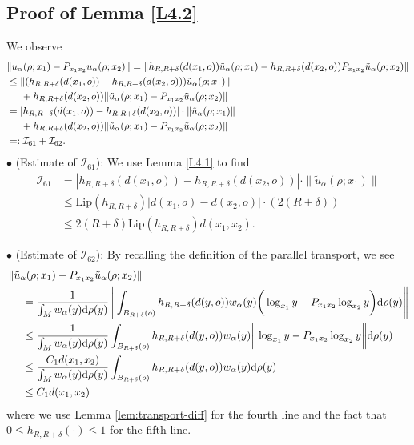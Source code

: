 \documentclass[11pt]{amsart}
\def\d{\mathrm{d}}
\newcommand{\p}{o}%
\newcommand{\dist}{d}%
\begin{document}
\subsection{Proof of Lemma \ref{L4.2}}\label{proof:L4.2}
We observe 
\begin{align*}
&\|u_\alpha(\rho;x_1)-P_{x_1x_2}u_\alpha(\rho;x_2)\| = \|h_{R,R+\delta}(\dist(x_1, \p))\tilde{u}_\alpha(\rho;x_1)-h_{R,R+\delta}(\dist(x_2, \p))P_{x_1x_2}\tilde{u}_\alpha(\rho;x_2)\|\\
&\leq\|(h_{R, R+\delta}(\dist(x_1, \p))-h_{R, R+\delta}(\dist(x_2, \p)))\tilde{u}_\alpha(\rho;x_1)\| \\
&\hspace{0.5cm}+h_{R, R+\delta}(\dist(x_2, \p))\|\tilde{u}_\alpha(\rho;x_1)-P_{x_1x_2}\tilde{u}_\alpha(\rho;x_2)\|\\
& = |h_{R, R+\delta}(\dist(x_1, \p))-h_{R, R+\delta}(\dist(x_2, \p))|\cdot \|\tilde{u}_\alpha(\rho;x_1)\| \\
&\hspace{0.5cm}+h_{R, R+\delta}(\dist(x_2, \p))\|\tilde{u}_\alpha(\rho;x_1)-P_{x_1x_2}\tilde{u}_\alpha(\rho;x_2)\| \\
&=: \mathcal I_{61} + \mathcal I_{62}.
\end{align*}
$\bullet$ (Estimate of $\mathcal I_{61}$): We use Lemma \ref{L4.1} to find 
\begin{align*}
\mathcal I_{61} & = |h_{R, R+\delta}(\dist(x_1, \p))-h_{R, R+\delta}(\dist(x_2, \p))|\cdot \|\tilde{u}_\alpha(\rho;x_1)\| \\
&\leq \mathrm{Lip}(h_{R, R+\delta})|\dist(x_1, \p)-\dist(x_2, \p)|\cdot (2(R+\delta))\\
&\leq2(R+\delta)\mathrm{Lip}(h_{R, R+\delta})\dist(x_1, x_2).
\end{align*}

\noindent $\bullet$ (Estimate of $\mathcal I_{62}$): By recalling the definition of the parallel transport, we see
\begin{align*}
&\left\|\tilde{u}_\alpha(\rho;x_1)-P_{x_1 x_2}\tilde{u}_\alpha(\rho;x_2)\right\|\\
&\hspace{0.5cm}=\frac{1}{\int_M w_\alpha(y)\d\rho(y)}\left\|\int_{B_{R+\delta}(\p)}h_{R, R+\delta}(\dist(y, \p))w_\alpha(y)\bigg(\log_{x_1}y-P_{x_1x_2}\log_{x_2}y\bigg)\d \rho(y)\right\|\\
&\hspace{0.5cm}\leq\frac{1}{\int_M w_\alpha(y)\d\rho(y)}\int_{B_{R+\delta}(\p)}h_{R, R+\delta}(\dist(y, \p))w_\alpha(y)\bigg\|\log_{x_1}y-P_{x_1x_2}\log_{x_2}y\bigg\|\d \rho(y)\\
&\hspace{0.5cm}\leq\frac{C_1\dist(x_1, x_2)}{\int_M w_\alpha(y)\d\rho(y)}\int_{B_{R+\delta}(\p)}h_{R, R+\delta}(\dist(y, \p))w_\alpha(y)\d \rho(y)\\
&\hspace{0.5cm}\leq C_1\dist(x_1, x_2)
\end{align*}
where we use Lemma \ref{lem:transport-diff} for the fourth line and the fact that $0\leq h_{R,R+\delta}(\cdot)\leq 1$ for the fifth line. 
\end{document}
